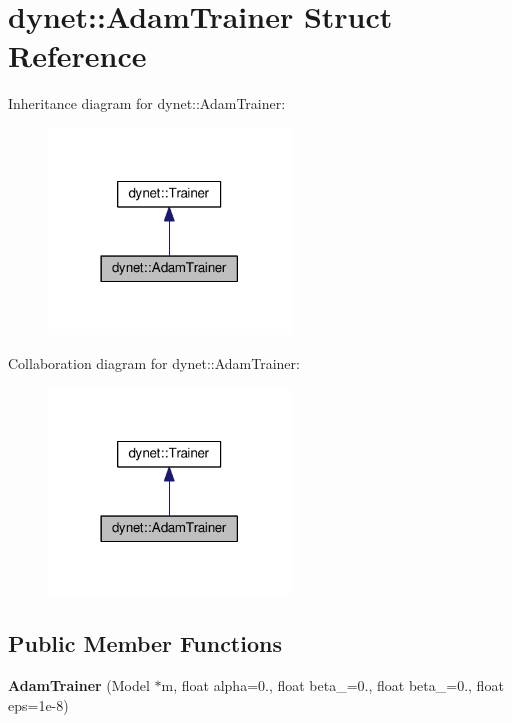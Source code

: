 \hypertarget{structdynet_1_1AdamTrainer}{}\section{dynet\+:\+:Adam\+Trainer Struct Reference}
\label{structdynet_1_1AdamTrainer}


Inheritance diagram for dynet\+:\+:Adam\+Trainer\+:\nopagebreak
\begin{figure}[H]
\begin{center}
\leavevmode
\includegraphics[width=182pt]{structdynet_1_1AdamTrainer__inherit__graph}
\end{center}
\end{figure}


Collaboration diagram for dynet\+:\+:Adam\+Trainer\+:\nopagebreak
\begin{figure}[H]
\begin{center}
\leavevmode
\includegraphics[width=182pt]{structdynet_1_1AdamTrainer__coll__graph}
\end{center}
\end{figure}
\subsection*{Public Member Functions}
\begin{DoxyCompactItemize}
\item 
\hypertarget{structdynet_1_1AdamTrainer_a4990f1adf7d703209f12333cd6956642}{}{\bfseries Adam\+Trainer} (Model $\ast$m, float alpha=0., float beta\+\_=0., float beta\+\_=0., float eps=1e-\/8)\label{structdynet_1_1AdamTrainer_a4990f1adf7d703209f12333cd6956642}

\end{DoxyCompactItemize}
